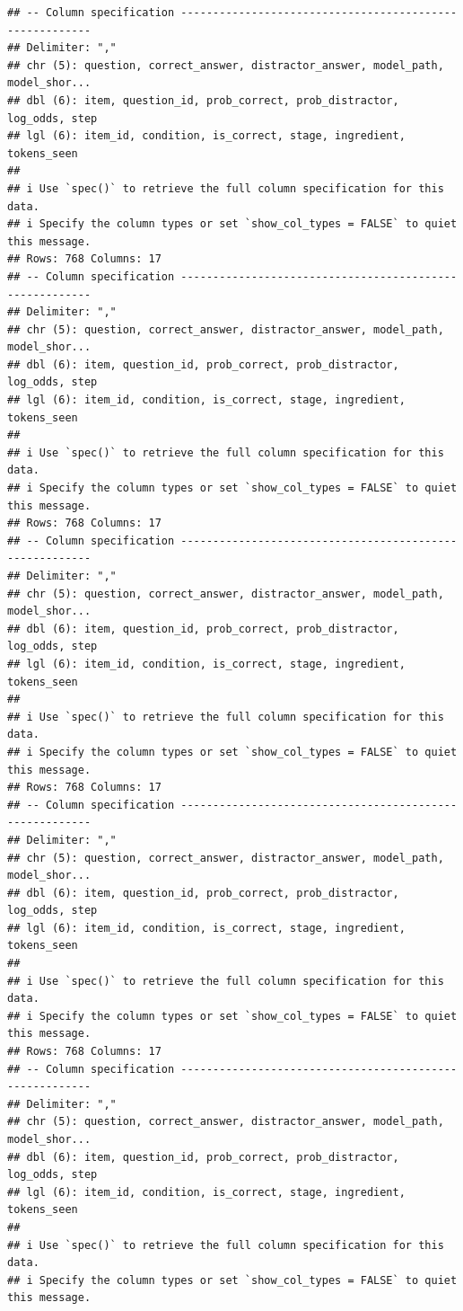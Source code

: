 \documentclass[
]{article}
\begin{document}
\begin{verbatim}
## -- Column specification --------------------------------------------------------
## Delimiter: ","
## chr (5): question, correct_answer, distractor_answer, model_path, model_shor...
## dbl (6): item, question_id, prob_correct, prob_distractor, log_odds, step
## lgl (6): item_id, condition, is_correct, stage, ingredient, tokens_seen
## 
## i Use `spec()` to retrieve the full column specification for this data.
## i Specify the column types or set `show_col_types = FALSE` to quiet this message.
## Rows: 768 Columns: 17
## -- Column specification --------------------------------------------------------
## Delimiter: ","
## chr (5): question, correct_answer, distractor_answer, model_path, model_shor...
## dbl (6): item, question_id, prob_correct, prob_distractor, log_odds, step
## lgl (6): item_id, condition, is_correct, stage, ingredient, tokens_seen
## 
## i Use `spec()` to retrieve the full column specification for this data.
## i Specify the column types or set `show_col_types = FALSE` to quiet this message.
## Rows: 768 Columns: 17
## -- Column specification --------------------------------------------------------
## Delimiter: ","
## chr (5): question, correct_answer, distractor_answer, model_path, model_shor...
## dbl (6): item, question_id, prob_correct, prob_distractor, log_odds, step
## lgl (6): item_id, condition, is_correct, stage, ingredient, tokens_seen
## 
## i Use `spec()` to retrieve the full column specification for this data.
## i Specify the column types or set `show_col_types = FALSE` to quiet this message.
## Rows: 768 Columns: 17
## -- Column specification --------------------------------------------------------
## Delimiter: ","
## chr (5): question, correct_answer, distractor_answer, model_path, model_shor...
## dbl (6): item, question_id, prob_correct, prob_distractor, log_odds, step
## lgl (6): item_id, condition, is_correct, stage, ingredient, tokens_seen
## 
## i Use `spec()` to retrieve the full column specification for this data.
## i Specify the column types or set `show_col_types = FALSE` to quiet this message.
## Rows: 768 Columns: 17
## -- Column specification --------------------------------------------------------
## Delimiter: ","
## chr (5): question, correct_answer, distractor_answer, model_path, model_shor...
## dbl (6): item, question_id, prob_correct, prob_distractor, log_odds, step
## lgl (6): item_id, condition, is_correct, stage, ingredient, tokens_seen
## 
## i Use `spec()` to retrieve the full column specification for this data.
## i Specify the column types or set `show_col_types = FALSE` to quiet this message.

\end{verbatim}
\end{document}
